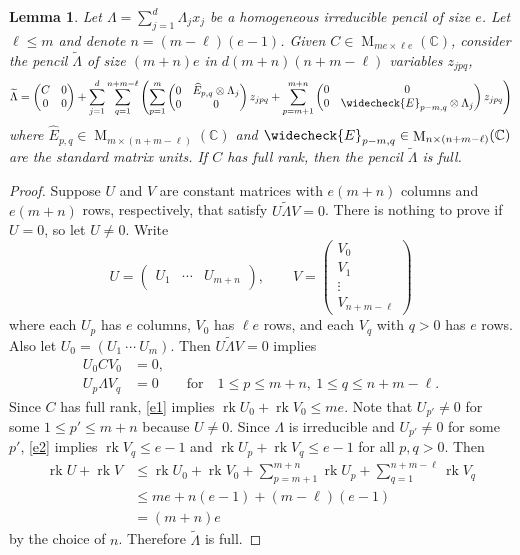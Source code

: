 \documentclass[12pt,a4paper]{amsart}
\DeclareMathOperator{\rk}{rk}
\DeclareMathOperator{\opm}{M}
\newcommand{\C}{\mathbb{C}}
\newcommand*{\mat}[1]{\opm_{#1}(\C)}
\newtheorem{lem}[thm]{Lemma}
\theoremstyle{definition}
\theoremstyle{remark}
\numberwithin{equation}{section}
\begin{document}
\begin{lem}\label{l:irr}
Let $\Lambda = \sum_{j=1}^d\Lambda_jx_j$ be a homogeneous irreducible pencil of size $e$. Let $\ell\le m$ and denote $n=(m-\ell)(e-1)$. Given $C\in\mat{me\times \ell e}$, consider the pencil $\widetilde{\Lambda}$ of size $(m+n)e$ in $d(m+n)(n+m-\ell)$ variables $z_{jpq}$,
$$\widetilde{\Lambda} = 
\begin{pmatrix}
C & 0 \\ 0 & 0
\end{pmatrix}
+\sum_{j=1}^d\sum_{q=1}^{n+m-\ell}\left(
\sum_{p=1}^m
\begin{pmatrix}
0 & \widehat{E}_{p,q}\otimes \Lambda_j \\ 0 & 0
\end{pmatrix}z_{jpq}
+\sum_{p=m+1}^{m+n}
\begin{pmatrix}
0 & 0 \\ 0 & \widecheck{E}_{p-m,q}\otimes \Lambda_j
\end{pmatrix}z_{jpq}
\right)
$$
where $\widehat{E}_{p,q} \in\mat{m\times (n+m-\ell)}$ and $\widecheck{E}_{p-m,q} \in\mat{n\times (n+m-\ell)}$ are the standard matrix units. If $C$ has full rank, then the pencil $\widetilde{\Lambda}$ is full.
\end{lem}

\begin{proof}
Suppose $U$ and $V$ are constant matrices with $e(m+n)$ columns and $e(m+n)$ rows, respectively, that satisfy $U\widetilde{\Lambda}V=0$. There is nothing to prove if $U=0$, so let $U\neq0$. Write
$$U=\begin{pmatrix} U_1 & \cdots & U_{m+n}\end{pmatrix},
\qquad
V=\begin{pmatrix} V_0 \\ V_1 \\ \vdots \\ V_{n+m-\ell}\end{pmatrix}$$
where each $U_p$ has $e$ columns, $V_0$ has $\ell e$ rows, and each $V_q$ with $q>0$ has $e$ rows. Also let $U_0=(U_1 \ \cdots \ U_m)$. Then $U\widetilde{\Lambda}V=0$ implies
\begin{align}
\label{e1} U_0CV_0 & = 0, \\
\label{e2} U_p\Lambda V_q & = 0 \qquad \text{for}\quad 1\le p\le m+n,\ 1\le q\le n+m-\ell.
\end{align}
Since $C$ has full rank, \eqref{e1} implies $\rk U_0+\rk V_0\le me$. Note that $U_{p'}\neq0$ for some $1\le p'\le m+n$ because $U\neq0$. Since $\Lambda$ is irreducible and $U_{p'}\neq 0$ for some $p'$, \eqref{e2} implies $\rk V_q\le e-1$ and $\rk U_p+\rk V_q\le e-1$ for all $p,q>0$. Then
\begin{align*}
\rk U+\rk V
& \le \rk U_0+\rk V_0+\sum_{p=m+1}^{m+n} \rk U_p+\sum_{q=1}^{n+m-\ell}\rk V_q \\
& \le me+n(e-1)+(m-\ell)(e-1) \\
& = (m+n)e 
\end{align*}
by the choice of $n$. Therefore $\widetilde{\Lambda}$ is full.
\end{proof}
\end{document}
